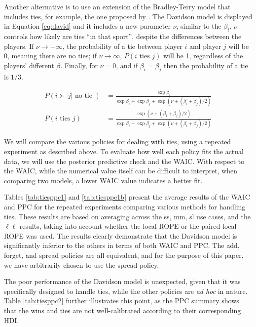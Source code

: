 \documentclass[twoside,11pt,preprint]{article}
\begin{document}
Another alternative is to use an extension of the Bradley-Terry model
that includes ties, for example, the one proposed by
\citet{davidson1970extending}. The Davidson model is displayed in Equation
\ref{eq:david} and it includes a new parameter \(\nu\), similar to the
\(\beta_i\). \(\nu\) controls how likely are ties ``in that sport'', despite the
differences between the players. If \(\nu \rightarrow -\infty\), the probability
of a tie between player \(i\) and player \(j\) will be 0, meaning there are no ties;
if \(\nu \rightarrow \infty\), \(P( i \mbox{~ties~} j)\) will be 1, regardless of
the players' different \(\beta\). Finally, for \(\nu = 0\), and if \(\beta_i = \beta_j\) then the probability of a tie is \(1/3\).

\begin{align}
 P(i \succ\,j | \mbox{~no tie~}) &= \frac{\exp \beta_i}{\exp \beta_i +\exp \beta_j + \exp(\nu + (\beta_i + \beta_j)/2) }  \label{eq:david}\\
P( i \mbox{~ties~} j) &= \frac{\exp (\nu + (\beta_i + \beta_j)/2) }{\exp \beta_i +\exp \beta_j + \exp (\nu + (\beta_i + \beta_j)/2 ) } \nonumber
\end{align}

We will compare the various policies for dealing with ties, using a repeated
experiment as described above. To evaluate how well each policy fits the actual
data, we will use the posterior predictive check and the WAIC. With respect to
the WAIC, while the numerical value itself can be difficult to interpret, when
comparing two models, a lower WAIC value indicates a better fit.

Tables \ref{tab:tiesppc1} and \ref{tab:tiesppc1b} present the average results of the WAIC and PPC for the repeated experiments comparing various methods for handling ties. These results are based on averaging across the ss, mm, sl use cases, and the $\ell\ell$-results, taking into account whether the local ROPE or the paired local ROPE was used. The results clearly demonstrate that the Davidson model is significantly inferior to the others in terms of both WAIC and PPC. The add, forget, and spread policies are all equivalent, and for the purpose of this paper, we have arbitrarily chosen to use the spread policy.

The poor performance of the Davidson model is unexpected, given that it was specifically designed to handle ties, while the other policies are \emph{ad hoc} in nature. Table \ref{tab:tiesppc2} further illustrates this point, as the PPC summary shows that the wins and ties are not well-calibrated according to their corresponding HDI.
\end{document}
